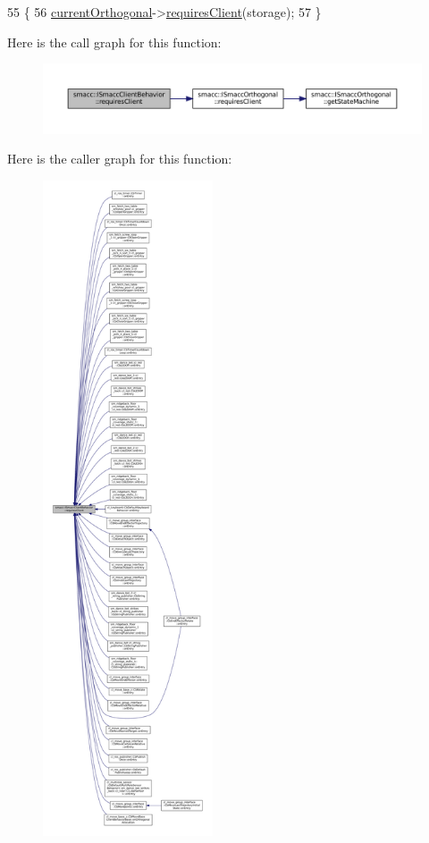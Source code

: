 \begin{DoxyCode}
55 \{
56     \hyperlink{classsmacc_1_1ISmaccClientBehavior_a0d606b804769a11b4f672243a014bed8}{currentOrthogonal}->\hyperlink{classsmacc_1_1ISmaccOrthogonal_a602e16b09f8a1b3de889f2f3d90a3211}{requiresClient}(storage);
57 \}
\end{DoxyCode}
Here is the call graph for this function\+:
\nopagebreak
\begin{figure}[H]
\begin{center}
\leavevmode
\includegraphics[width=350pt]{classsmacc_1_1ISmaccClientBehavior_a32b16e99e3b4cb289414203dc861a440_cgraph}
\end{center}
\end{figure}
Here is the caller graph for this function\+:
\nopagebreak
\begin{figure}[H]
\begin{center}
\leavevmode
\includegraphics[height=550pt]{classsmacc_1_1ISmaccClientBehavior_a32b16e99e3b4cb289414203dc861a440_icgraph}
\end{center}
\end{figure}
